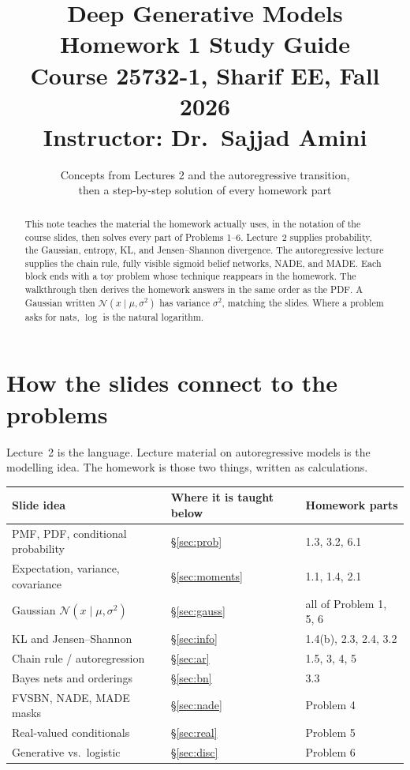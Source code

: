 \documentclass[11pt]{article}
\title{Deep Generative Models\\
\large Homework 1 Study Guide\\
\normalsize Course 25732-1, Sharif EE, Fall 2026\\
Instructor: Dr.\ Sajjad Amini}
\author{Concepts from Lectures 2 and the autoregressive transition,\\
then a step-by-step solution of every homework part}
\date{}
\theoremstyle{remark}
\newcommand{\N}{\mathcal{N}}
\begin{document}
\maketitle
\begin{abstract}
\noindent
This note teaches the material the homework actually uses, in the notation of the course slides, then solves every part of Problems 1--6. Lecture~2 supplies probability, the Gaussian, entropy, KL, and Jensen--Shannon divergence. The autoregressive lecture supplies the chain rule, fully visible sigmoid belief networks, NADE, and MADE. Each block ends with a toy problem whose technique reappears in the homework. The walkthrough then derives the homework answers in the same order as the PDF. A Gaussian written \(\N(x\mid\mu,\sigma^2)\) has variance \(\sigma^2\), matching the slides. Where a problem asks for nats, \(\log\) is the natural logarithm.
\end{abstract}
\tableofcontents
\newpage

\section{How the slides connect to the problems}

Lecture~2 is the language. Lecture material on autoregressive models is the modelling idea. The homework is those two things, written as calculations.

\begin{center}
\small
\begin{tabular}{@{}lll@{}}
\toprule
Slide idea & Where it is taught below & Homework parts \\
\midrule
PMF, PDF, conditional probability & \S\ref{sec:prob} & 1.3, 3.2, 6.1 \\
Expectation, variance, covariance & \S\ref{sec:moments} & 1.1, 1.4, 2.1 \\
Gaussian \(\N(x\mid\mu,\sigma^2)\) & \S\ref{sec:gauss} & all of Problem 1, 5, 6 \\
KL and Jensen--Shannon & \S\ref{sec:info} & 1.4(b), 2.3, 2.4, 3.2 \\
Chain rule / autoregression & \S\ref{sec:ar} & 1.5, 3, 4, 5 \\
Bayes nets and orderings & \S\ref{sec:bn} & 3.3 \\
FVSBN, NADE, MADE masks & \S\ref{sec:nade} & Problem 4 \\
Real-valued conditionals & \S\ref{sec:real} & Problem 5 \\
Generative vs.\ logistic & \S\ref{sec:disc} & Problem 6 \\
\bottomrule
\end{tabular}
\end{center}
\end{document}
